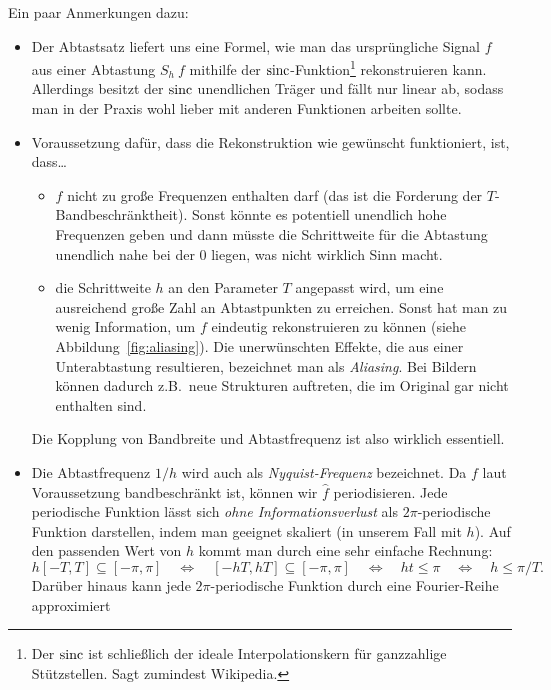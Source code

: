 \begin{remark}
Ein paar Anmerkungen dazu:
\begin{itemize}
\item Der Abtastsatz liefert uns eine Formel, wie man das ursprüngliche Signal $ f $ aus einer
  Abtastung $ S_{h} \ f $ mithilfe der $ \operatorname{sinc} $-Funktion\footnote{Der $ \operatorname{sinc} $ ist schließlich 
  der ideale Interpolationskern für ganzzahlige Stützstellen. Sagt zumindest Wikipedia.} 
  rekonstruieren kann. Allerdings besitzt der $ \operatorname{sinc} $ unendlichen Träger und fällt nur linear ab, 
  sodass man in der Praxis wohl lieber mit anderen Funktionen arbeiten sollte. 
\item Voraussetzung dafür, dass die Rekonstruktion wie gewünscht funktioniert, ist, dass\dots
  \begin{itemize}
  \item $ f $ nicht zu große Frequenzen enthalten darf (das ist die Forderung der
    $ T $-Bandbeschränktheit). Sonst könnte es potentiell unendlich hohe Frequenzen geben und dann
    müsste die Schrittweite für die Abtastung unendlich nahe bei der $ 0 $ liegen, was nicht
    wirklich Sinn macht.
  \item die Schrittweite $ h $ an den Parameter $ T $ angepasst wird, um eine ausreichend große 
    Zahl an Abtastpunkten zu erreichen. Sonst hat man zu wenig Information, um $ f $ eindeutig 
    rekonstruieren zu können (siehe Abbildung~\ref{fig:aliasing}). Die unerwünschten Effekte, die 
    aus einer Unterabtastung resultieren, bezeichnet man als \emph{Aliasing}. Bei Bildern können 
    dadurch z.B.\ neue Strukturen auftreten, die im Original gar nicht enthalten sind.
  \end{itemize}
  Die Kopplung von Bandbreite und Abtastfrequenz ist also wirklich essentiell. 
\item Die Abtastfrequenz $ 1 / h $ wird auch als \emph{Nyquist-Frequenz} bezeichnet. Da $ f $ laut
  Voraussetzung bandbeschränkt ist, können wir $ \widehat{f} $ periodisieren. Jede periodische
  Funktion lässt sich \emph{ohne Informationsverlust} als $ 2\pi $-periodische Funktion darstellen, 
  indem man geeignet skaliert (in unserem Fall mit $ h $). Auf den passenden Wert von $ h $ kommt 
  man durch eine sehr einfache Rechnung:
  \[
    h [-T, T] \subseteq [-\pi, \pi] \quad \Leftrightarrow \quad 
    [-hT, hT] \subseteq [-\pi, \pi] \quad \Leftrightarrow \quad 
    ht \leq \pi \quad \Leftrightarrow \quad 
    h \leq \pi / T.
  \]
  Darüber hinaus kann jede $ 2\pi $-periodische Funktion durch eine Fourier-Reihe approximiert 

\end{itemize}
\end{remark}
